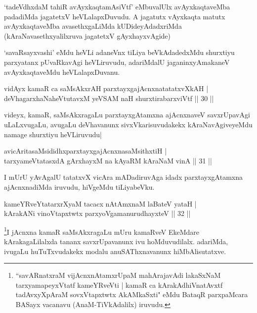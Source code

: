 \begin{artha}
`tadeVdhxdaM tahiR avAyxkaqtamAsiVtf' eMbuvalUlx avAyxkaqtaveMba padadiMda jagatetxV heVLalapxDuvudu. A jagatutx vAyxkaqta matutx avAyxkaqtaveMba avasethxgaLiMda kUDideyAdadxriMda (kAraNavasethxyalilxruva jagatetxV gAyxhayxvAgide)

`savaRsayxvashi' eMdu heVLi adaneVnx tiLiya beVkAdadedxMdu shurxtiyu parxyatanx pUvaRkavAgi heVLiruvudu, adariMdalU jaganinxyAmakaneV avAyxkaqtaveMdu heVLalapxDuvanu.
\end{artha}


\begin{shl}
vidAyx kamaR ca saMsAkxrAH parxtayxgajAcnxnatatatxvXkAH |\\
deVhagarxhaNaheVtutavxM yeVSAM naH shurxtirabarxviVtf \hfill || 30 ||
\end{shl}

\begin{artha}
videyx, kamaR, saMsAkxragaLu parxtayxgAtamxna ajAcnxnaveV savxrUpavAgi uLaLxvugaLu, avugaLu deVhavanunx sivxVkarisuvudakekx kAraNavAgiveyeMdu namage shurxtiyu heVLiruvudu|
\end{artha}

\begin{shl}
avicAritasaMsididhxparxtayxgajAcnxnasaMsithxtiH |\\
tarxyameVtatasxdA gArxhayxM na kAyaRM kAraNaM vinA \hfill || 31 ||
\end{shl}

\begin{artha}
I mUrU yAvAgalU tatatxvX vicAra mADadiruvAga idadx parxtayxgAtamxna ajAcnxnadiMda iruvudu, hiVgeMdu tiLiyabeVku. 
\end{artha}


\begin{shl}
kameYRveYtatarxrXyaM tacacx nA\s \s tAmxnaM laBateV yataH |\\
kArakANi vinoVtapxtwtx parxyoVgamanurudhayxteV \hfill || 32 ||
\end{shl}

\begin{artha}
\footnote[1]{``savARnatxraM vijAcnxnAtamxrUpaM mahArajavAdi lakaSxNaM tarxyamapeyxVtatf kameYRveVti | kamaR ca kArakAdhiVnatAvxtf tadAvxyXpAraM sovxVtapxtwtx AkAMkaSxti" eMdu BataqR parxpaMcara BASayx vacanavu (AnaM-TiVkAdalilx) iruvudu.}I jAcnxna kamaR saMsAkxragaLu mUru kamaRveV EkeMdare kArakagaLilalxda tananx savxrUpavanunx ivu hoMduvudilalx. adariMda, ivugaLu huTuTxvudakekx modalu anuSAThxnavanunx hiMbAlisutatxve.
\end{artha}

